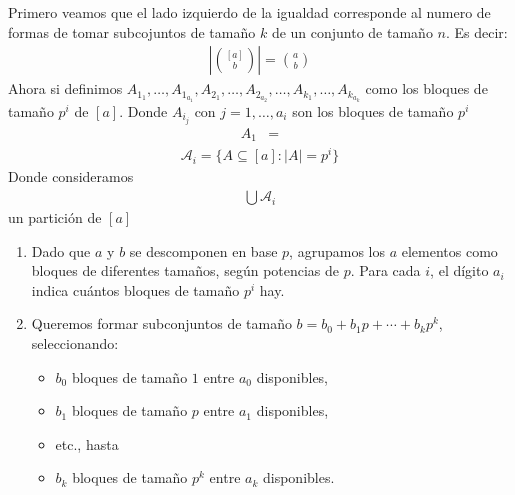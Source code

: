 \begin{itemize}
    Primero veamos que el lado izquierdo de la igualdad corresponde al numero de formas de tomar subcojuntos de tamaño $k$ de un conjunto de tamaño $n$. Es decir:
    \begin{align*}
        \left|\binom{[a]}{b}\right| = \binom{a}{b} 
    \end{align*}
    Ahora si definimos $A_{1_1},\dots, A_{1_{a_1}}, A_{2_{1}},\dots, A_{2_{a_2}},\dots, A_{k_1},\dots, A_{k_{a_k}}$ como los bloques de tamaño $p^i$ de $[a]$. Donde $A_{i_j}$ con $j=1,\dots, a_i$ son los bloques de tamaño $p^i$
    \begin{align*}
        A_1 &=
    \end{align*}
    \begin{align*}
        \mathcal A_i =\{A\subseteq [a]: |A| = p^i\}
    \end{align*}
    Donde consideramos
    \begin{align*}
        \bigcup \mathcal A_i 
    \end{align*}
    un partición de $[a]$
    \begin{enumerate}[label=\textbf{\arabic*.}]
        \item Dado que $a$ y $b$ se descomponen en base $p$, agrupamos los $a$ elementos como bloques de diferentes tamaños, según potencias de $p$. Para cada $i$, el dígito $a_i$ indica cuántos bloques de tamaño $p^i$ hay.
    
        \item Queremos formar subconjuntos de tamaño $b = b_0 + b_1 p + \cdots + b_k p^k$, seleccionando:
        \begin{itemize}
            \item $b_0$ bloques de tamaño $1$ entre $a_0$ disponibles,
            \item $b_1$ bloques de tamaño $p$ entre $a_1$ disponibles,
            \item etc., hasta
            \item $b_k$ bloques de tamaño $p^k$ entre $a_k$ disponibles.
        \end{itemize}
    

\end{enumerate}
\end{itemize}
